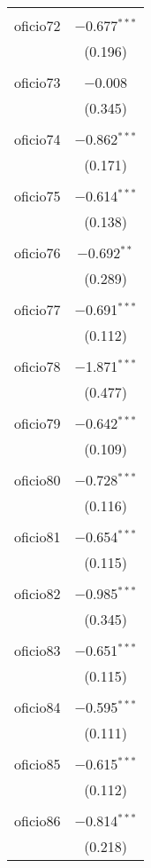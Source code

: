 \begin{table}[!htbp]
\begin{tabular}{@{\extracolsep{5pt}}lc}
  & \\ 
 oficio72 & $-$0.677$^{***}$ \\ 
  & (0.196) \\ 
  & \\ 
 oficio73 & $-$0.008 \\ 
  & (0.345) \\ 
  & \\ 
 oficio74 & $-$0.862$^{***}$ \\ 
  & (0.171) \\ 
  & \\ 
 oficio75 & $-$0.614$^{***}$ \\ 
  & (0.138) \\ 
  & \\ 
 oficio76 & $-$0.692$^{**}$ \\ 
  & (0.289) \\ 
  & \\ 
 oficio77 & $-$0.691$^{***}$ \\ 
  & (0.112) \\ 
  & \\ 
 oficio78 & $-$1.871$^{***}$ \\ 
  & (0.477) \\ 
  & \\ 
 oficio79 & $-$0.642$^{***}$ \\ 
  & (0.109) \\ 
  & \\ 
 oficio80 & $-$0.728$^{***}$ \\ 
  & (0.116) \\ 
  & \\ 
 oficio81 & $-$0.654$^{***}$ \\ 
  & (0.115) \\ 
  & \\ 
 oficio82 & $-$0.985$^{***}$ \\ 
  & (0.345) \\ 
  & \\ 
 oficio83 & $-$0.651$^{***}$ \\ 
  & (0.115) \\ 
  & \\ 
 oficio84 & $-$0.595$^{***}$ \\ 
  & (0.111) \\ 
  & \\ 
 oficio85 & $-$0.615$^{***}$ \\ 
  & (0.112) \\ 
  & \\ 
 oficio86 & $-$0.814$^{***}$ \\ 
  & (0.218) \\ 

\end{tabular}
\end{table}
